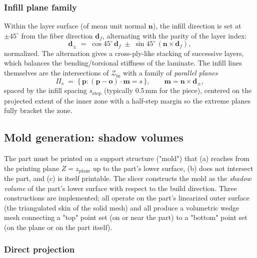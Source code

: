 \subsubsection{Infill plane family}

Within the layer surface (of mean unit normal $\mathbf{n}$), the
infill direction is set at $\pm 45^\circ$ from the fiber direction
$\mathbf{d}_f$, alternating with the parity of the layer index:
\begin{equation}
  \mathbf{d}_{\pm} \;=\;
  \cos 45^\circ \, \mathbf{d}_f \;\pm\;
  \sin 45^\circ \, (\mathbf{n} \times \mathbf{d}_f),
\end{equation}
normalized. The alternation gives a cross-ply-like stacking of
successive layers, which balances the bending/torsional stiffness of
the laminate. The infill lines themselves are the intersections of
$\mathcal{Z}_{\mathrm{in}}$ with a family of \emph{parallel planes}
\begin{equation}
  \Pi_s \;=\; \{\,\mathbf{p} : (\mathbf{p} - \mathbf{o}) \cdot \mathbf{m} = s\,\},
  \qquad \mathbf{m} = \mathbf{n} \times \mathbf{d}_\pm,
\end{equation}
spaced by the infill spacing $s_{\mathrm{step}}$ (typically 0.5\,mm
for the piece), centered on the projected extent of the inner zone
with a half-step margin so the extreme planes fully bracket the zone.

\subsection{Mold generation: shadow volumes}\label{sec:meth-shadow}

The part must be printed on a support structure ("mold") that
(a) reaches from the printing plane $Z = z_{\mathrm{plane}}$ up to the
part's lower surface, (b) does not intersect the part, and (c) is
itself printable. The slicer constructs the mold as the
\emph{shadow volume} of the part's lower surface with respect to the
build direction. Three constructions are implemented; all operate on
the part's linearized outer surface (the triangulated skin of the
solid mesh) and all produce a volumetric wedge mesh connecting a "top"
point set (on or near the part) to a "bottom" point set (on the
plane or on the part itself).

\subsubsection{Direct projection}

